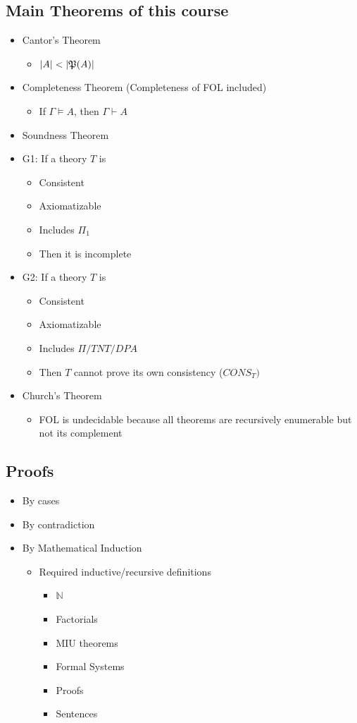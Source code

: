\documentclass[11pt]{article}
\begin{document}
\subsection{Main Theorems of this course}
\label{sec:org3b7073d}
\begin{itemize}
\item Cantor's Theorem
\begin{itemize}
\item \(|A|<|\frak{P}(A)|\)
\end{itemize}
\item Completeness Theorem (Completeness of FOL included)
\begin{itemize}
\item If \(\Gamma \models A\), then \(\Gamma \vdash A\)
\end{itemize}
\item Soundness Theorem
\item G1: If a theory \(T\) is
\begin{itemize}
\item Consistent
\item Axiomatizable
\item Includes \(\Pi_1\)
\item Then it is incomplete
\end{itemize}
\item G2: If a theory \(T\) is
\begin{itemize}
\item Consistent
\item Axiomatizable
\item Includes \(\Pi/TNT/DPA\)
\item Then \(T\) cannot prove its own consistency (\(CONS_T)\)
\end{itemize}
\item Church's Theorem
\begin{itemize}
\item FOL is undecidable because all theorems are recursively enumerable but not its complement
\end{itemize}
\end{itemize}
\subsection{Proofs}
\label{sec:orgca6ea49}
\begin{itemize}
\item By cases
\item By contradiction
\item By Mathematical Induction
\begin{itemize}
\item Required inductive/recursive definitions
\begin{itemize}
\item \(\mathbb{N}\)
\item Factorials
\item MIU theorems
\item Formal Systems
\item Proofs
\item Sentences
\end{itemize}
\end{itemize}
\end{itemize}
\end{document}
